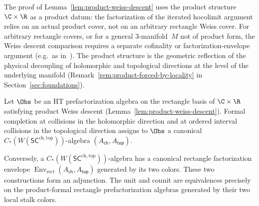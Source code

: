 \begin{remark}
\label{rem:product-weiss}
The proof of Lemma~\ref{lem:product-weiss-descent} uses the product
structure $\C \times \R$ as a product datum: the factorization of the
iterated hocolimit argument relies on an actual product cover, not
on an arbitrary rectangle Weiss cover. For arbitrary rectangle
covers, or for a general $3$-manifold~$M$ not of product form, the
Weiss descent comparison requires a separate cofinality or
factorization-envelope argument (e.g.\ as in~\cite{CG17}). The
product structure is the geometric reflection of the physical
decoupling of holomorphic and topological directions at the level of
the underlying manifold (Remark~\ref{rem:product-forced-by-locality}
in Section~\ref{sec:foundations}).
\end{remark}

\begin{theorem}
\label{thm:recognition-SC}
Let $\Obs$ be an HT prefactorization algebra on the rectangle basis
of $\C\times\R$ satisfying product Weiss descent
\textup{(}Lemma~\ref{lem:product-weiss-descent}\textup{)}. Formal
completion at collisions in the holomorphic direction and at ordered
interval collisions in the topological direction assigns to $\Obs$ a
canonical $C_\ast(W(\mathsf{SC}^{\mathrm{ch,top}}))$-algebra
$(A_{\mathsf{ch}},A_{\mathsf{top}})$.

Conversely, a $C_\ast(W(\mathsf{SC}^{\mathrm{ch,top}}))$-algebra
has a canonical rectangle factorization envelope
$\operatorname{Env}_{\mathrm{rect}}(A_{\mathsf{ch}},A_{\mathsf{top}})$ generated
by its two colors. These two constructions form an adjunction. The
unit and counit are equivalences precisely on the product-formal
rectangle prefactorization algebras generated by their two local
stalk colors.
\end{theorem}


